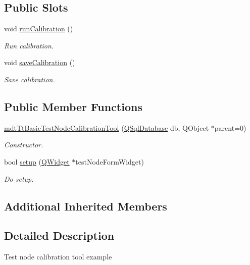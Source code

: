 \subsection*{Public Slots}
\begin{DoxyCompactItemize}
\item 
void \hyperlink{classmdt_tt_basic_test_node_calibration_tool_a0a524857582a178cbea54775cf526985}{run\-Calibration} ()
\begin{DoxyCompactList}\small\item\em Run calibration. \end{DoxyCompactList}\item 
void \hyperlink{classmdt_tt_basic_test_node_calibration_tool_a4582f51483a24b71231c47819dd96229}{save\-Calibration} ()
\begin{DoxyCompactList}\small\item\em Save calibration. \end{DoxyCompactList}\end{DoxyCompactItemize}
\subsection*{Public Member Functions}
\begin{DoxyCompactItemize}
\item 
\hyperlink{classmdt_tt_basic_test_node_calibration_tool_aeddd296806f3e2b7ea99ba220171a3c6}{mdt\-Tt\-Basic\-Test\-Node\-Calibration\-Tool} (\hyperlink{class_q_sql_database}{Q\-Sql\-Database} db, Q\-Object $\ast$parent=0)
\begin{DoxyCompactList}\small\item\em Constructor. \end{DoxyCompactList}\item 
bool \hyperlink{classmdt_tt_basic_test_node_calibration_tool_a471178c597a57866a6cefe86c4fba19e}{setup} (\hyperlink{class_q_widget}{Q\-Widget} $\ast$test\-Node\-Form\-Widget)
\begin{DoxyCompactList}\small\item\em Do setup. \end{DoxyCompactList}\end{DoxyCompactItemize}
\subsection*{Additional Inherited Members}


\subsection{Detailed Description}
Test node calibration tool example 

